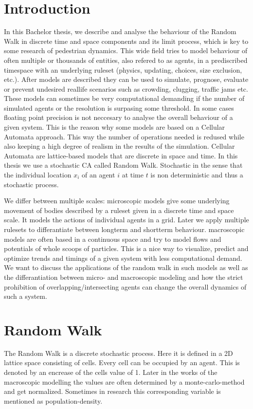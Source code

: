 

\section{Introduction}
In this Bachelor thesis, we describe and analyse the behaviour of the Random Walk in discrete time and space components
and its limit process, which is key to some research of pedestrian dynamics.
This wide field tries to model behaviour of often multiple or thousands of entities, also refered to as agents, in a prediscribed timespace with an underlying 
ruleset (physics, updating, choices, size exclusion, etc.). After models are described they can be used to simulate, prognose, evaluate or prevent undesired reallife scenarios such as crowding, clugging, traffic jams etc. 
These models can sometimes be very computational demanding if the number of simulated agents or the resolution is surpasing some threshold. In some cases floating point precision is not neccesary to analyse the overall behaviour of a given system.
This is the reason why some models are based on a Cellular Automata approach.
This way the number of operations needed is redused while also keeping a high degree of realism in the results of the simulation.
Cellular Automata are lattice-based models that are discrete in space and time. 
In this thesis we use a stochastic CA called Random Walk. Stochastic in the sense that the individual location $x_{i}$ of an agent $i$ at time $t$ is non deterministic and thus a stochastic process.
 
We differ between multiple scales: microscopic models give some underlying movement of bodies described by a ruleset given in a discrete time and space scale. It models the actions of individual agents in a grid. Later we apply multiple rulesets to differantiate between longterm and shortterm behaviour.
macroscopic models are often based in a continuous space and try to model flows and potentials of whole scoops of particles. This is a nice way to visualize, predict and optimize trends and timings of a given system with less computational demand.
We want to discuss the applications of the random walk in such models as well as the differantiation between micro- and macroscopic modeling and how the strict prohibition of overlapping/intersecting agents can change the overall dynamics of such a system. 

\newpage
\section{Random Walk}
The Random Walk is a discrete stochastic process. Here it is defined in a 2D lattice space consisting of cells. Every cell can be occupied by an agent. This is denoted by an encrease of the cells value of 1. 
Later in the works of the macroscopic modelling the values are often determined by a monte-carlo-method and get normalized. 
Sometimes in research this corresponding variable is mentioned as population-density.
